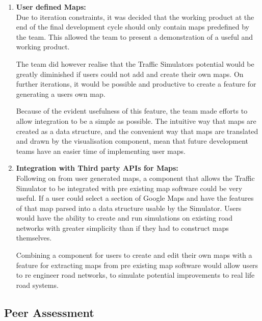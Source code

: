 \documentclass[11pt]{article}
\begin{document}
{\begin{enumerate}
\begin{enumerate}
	As well as Vehicle behaviour, the Analytical side of the Traffic Simulator could be improved with machine learning tools.
	
	@TODO - Perhaps add some more stuff here?\\
	
	\item \textbf{User defined Maps:} 
	\\
	
	Due to iteration constraints, it was decided that the working product at the end of the final development cycle should only contain maps predefined by the team. This allowed the team to present a demonstration of a useful and working product.
	
	The team did however realise that the Traffic Simulators potential would be greatly diminished if users could not add and create their own maps. On further iterations, it would be possible and productive to create a feature for generating a users own map.
	
	Because of the evident usefulness of this feature, the team made efforts to allow integration to be a simple as possible. The intuitive way that maps are created as a data structure, and the convenient way that maps are translated and drawn by the visualisation component, mean that future development teams have an easier time of implementing user maps.\\
	
	
	\item \textbf{Integration with Third party APIs for Maps:} 
	\\
	
	Following on from user generated maps, a component that allows the Traffic Simulator to be integrated with pre existing map software could be very useful. If a user could select a section of Google Maps and have the features of that map parsed into a data structure usable by the Simulator. Users would have the ability to create and run simulations on existing road networks with greater simplicity than if they had to construct maps themselves.
	
	Combining a component for users to create and edit their own maps with a feature for extracting maps from pre existing map software would allow users to re engineer road networks, to simulate potential improvements to real life road systems.
	
\end{enumerate}

	
\subsection{Peer Assessment}


\end{enumerate}}
\end{document}
